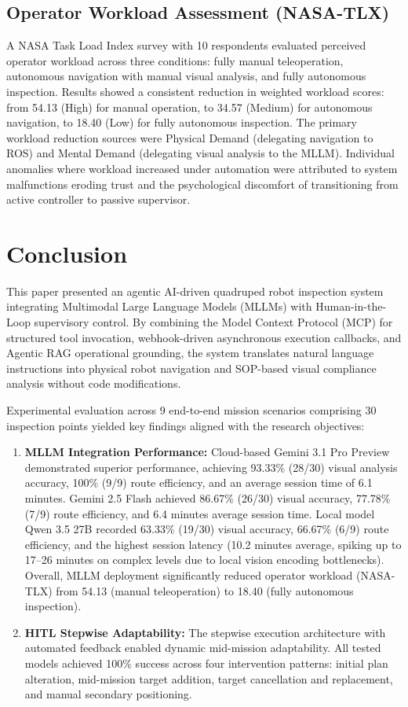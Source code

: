 \documentclass[conference]{IEEEtran}
\begin{document}
\subsection{Operator Workload Assessment (NASA-TLX)}
A NASA Task Load Index survey with 10 respondents evaluated perceived operator workload across three conditions: fully manual teleoperation, autonomous navigation with manual visual analysis, and fully autonomous inspection. Results showed a consistent reduction in weighted workload scores: from 54.13 (High) for manual operation, to 34.57 (Medium) for autonomous navigation, to 18.40 (Low) for fully autonomous inspection. The primary workload reduction sources were Physical Demand (delegating navigation to ROS) and Mental Demand (delegating visual analysis to the MLLM). Individual anomalies where workload increased under automation were attributed to system malfunctions eroding trust and the psychological discomfort of transitioning from active controller to passive supervisor.

\section{Conclusion}

This paper presented an agentic AI-driven quadruped robot inspection system integrating Multimodal Large Language Models (MLLMs) with Human-in-the-Loop supervisory control. By combining the Model Context Protocol (MCP) for structured tool invocation, webhook-driven asynchronous execution callbacks, and Agentic RAG operational grounding, the system translates natural language instructions into physical robot navigation and SOP-based visual compliance analysis without code modifications.

Experimental evaluation across 9 end-to-end mission scenarios comprising 30 inspection points yielded key findings aligned with the research objectives:
\begin{enumerate}
    \item \textbf{MLLM Integration Performance:} Cloud-based Gemini 3.1 Pro Preview demonstrated superior performance, achieving 93.33\% (28/30) visual analysis accuracy, 100\% (9/9) route efficiency, and an average session time of 6.1 minutes. Gemini 2.5 Flash achieved 86.67\% (26/30) visual accuracy, 77.78\% (7/9) route efficiency, and 6.4 minutes average session time. Local model Qwen 3.5 27B recorded 63.33\% (19/30) visual accuracy, 66.67\% (6/9) route efficiency, and the highest session latency (10.2 minutes average, spiking up to 17--26 minutes on complex levels due to local vision encoding bottlenecks). Overall, MLLM deployment significantly reduced operator workload (NASA-TLX) from 54.13 (manual teleoperation) to 18.40 (fully autonomous inspection).
    \item \textbf{HITL Stepwise Adaptability:} The stepwise execution architecture with automated feedback enabled dynamic mid-mission adaptability. All tested models achieved 100\% success across four intervention patterns: initial plan alteration, mid-mission target addition, target cancellation and replacement, and manual secondary positioning.
\end{enumerate}
\end{document}
